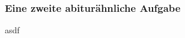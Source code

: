 \documentclass[a4paper,12pt]{article}
\begin{document}
\subsubsection*{Eine zweite abiturähnliche Aufgabe}

\question asdf
\end{document}
